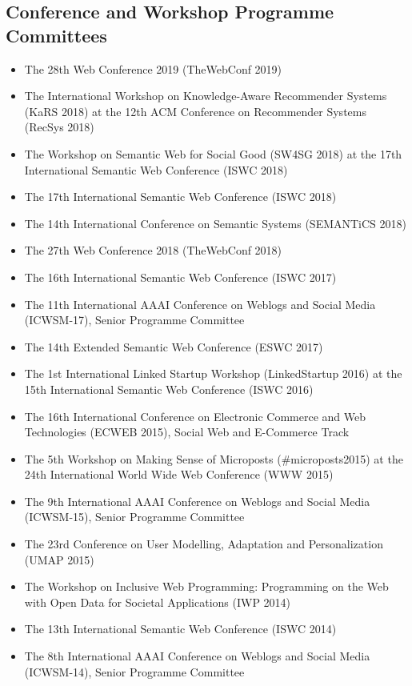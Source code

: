 \documentclass[10pt,a4paper]{res} %
\begin{document}
\begin{resume}
\subsection*{Conference and Workshop Programme Committees}

\begin{itemize} \itemsep -2pt
\item The 28th Web Conference 2019 (TheWebConf 2019)
\item The International Workshop on Knowledge-Aware Recommender Systems (KaRS 2018) at the 12th ACM Conference on Recommender Systems (RecSys 2018)
\item The Workshop on Semantic Web for Social Good (SW4SG 2018) at the 17th International Semantic Web Conference (ISWC 2018)
\item The 17th International Semantic Web Conference (ISWC 2018)
\item The 14th International Conference on Semantic Systems (SEMANTiCS 2018)
\item The 27th Web Conference 2018 (TheWebConf 2018)
\item The 16th International Semantic Web Conference (ISWC 2017)
\item The 11th International AAAI Conference on Weblogs and Social Media (ICWSM-17), Senior Programme Committee
\item The 14th Extended Semantic Web Conference (ESWC 2017)
\item The 1st International Linked Startup Workshop (LinkedStartup 2016) at the 15th International Semantic Web Conference (ISWC 2016)
\item The 16th International Conference on Electronic Commerce and Web Technologies (ECWEB 2015), Social Web and E-Commerce Track
\item The 5th Workshop on Making Sense of Microposts (\#microposts2015) at the 24th International World Wide Web Conference (WWW 2015)
\item The 9th International AAAI Conference on Weblogs and Social Media (ICWSM-15), Senior Programme Committee
\item The 23rd Conference on User Modelling, Adaptation and Personalization (UMAP 2015)
\item The Workshop on Inclusive Web Programming: Programming on the Web with Open Data for Societal Applications (IWP 2014)
\item The 13th International Semantic Web Conference (ISWC 2014)
\item The 8th International AAAI Conference on Weblogs and Social Media (ICWSM-14), Senior Programme Committee

\end{itemize}
\end{resume}
\end{document}

